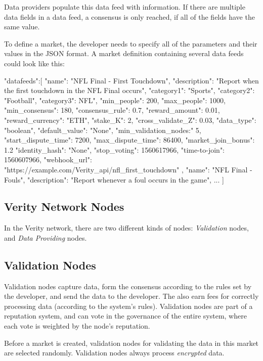 Data providers populate this data feed with information. If there are multiple data fields in a data feed, a consensus is only reached, if all of the fields have the same value.

To define a market, the developer needs to specify all of the parameters and their values in the JSON format. A market definition containing several data feeds could look like this:

\begin{GenericCode}
{
  "datafeeds":[
    {
      "name": "NFL Final - First Touchdown",
      "description": "Report when the first touchdown in the NFL Final occurs",
      "category1": "Sports",
      "category2": "Football",
      "category3":	NFL",
      "min_people": 200,
      "max_people":	1000,
      "min_consensus": 180,
      "consensus_rule": 0.7,
      "reward_amount": 0.01,
      "reward_currency": "ETH",
      "stake_K": 2,
      "cross_validate_Z": 0.03,
      "data_type": "boolean",
      "default_value": "None",
      "min_validation_nodes:" 5,
      "start_dispute_time": 7200,
      "max_dispute_time": 86400,
      "market_join_bonus": 1.2
      "identity_hash": "None",
      "stop_voting": 1560617966,
      "time-to-join": 1560607966,
      "webhook_url": "https://example.com/Verity_api/nfl_first_touchdown"
    },
    {
      "name": "NFL Final - Fouls",
      "description": "Report whenever a foul occurs in the game",
      ...
    }
  ]
}
\end{GenericCode} 

\subsection*{Verity Network Nodes}
In the Verity network, there are two different kinds of nodes: \emph{Validation} nodes, and \emph{Data Providing} nodes.

\subsection*{Validation Nodes}
Validation nodes capture data, form the consensus according to the rules set by the developer, and send the data to the developer. The also earn fees for correctly processing data (according to the system's rules). Validation nodes are part of a reputation system, and can vote in the governance of the entire system, where each vote is weighted by the node's reputation.

Before a market is created, validation nodes for validating the data in this market are selected randomly. Validation nodes always process \emph{encrypted} data\cite{veritywhitepaper}.

